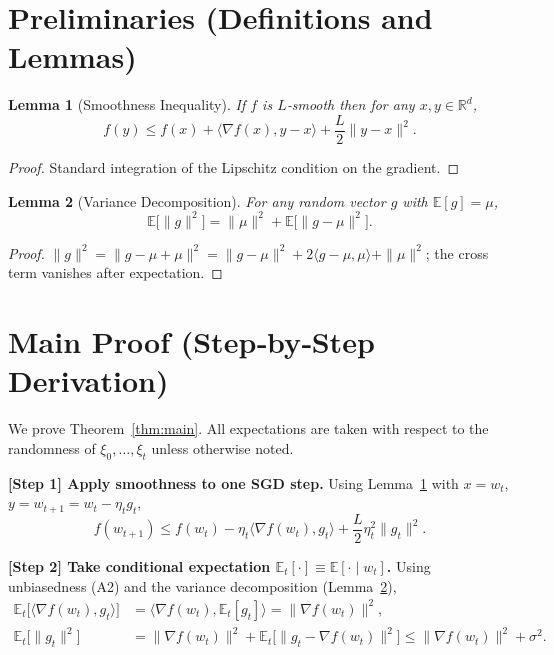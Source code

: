 \documentclass[11pt]{article}
\newtheorem{lemma}{Lemma}[section]
\begin{document}
\newpage
\section*{Preliminaries (Definitions and Lemmas)}
\begin{lemma}[Smoothness Inequality]\label{lem:smooth}
If $f$ is $L$‑smooth then for any $x,y\in\mathbb{R}^d$,
\[
f(y)\le f(x)+\langle\nabla f(x),y-x\rangle+\frac{L}{2}\|y-x\|^2 .
\]
\end{lemma}
\begin{proof}
Standard integration of the Lipschitz condition on the gradient. \end{proof}

\begin{lemma}[Variance Decomposition]\label{lem:variance}
For any random vector $g$ with $\mathbb{E}[g]=\mu$,
\[
\mathbb{E}\big[\|g\|^2\big]=\|\mu\|^2+\mathbb{E}\big[\|g-\mu\|^2\big].
\]
\end{lemma}
\begin{proof}
$\|g\|^2=\|g-\mu+\mu\|^2=\|g-\mu\|^2+2\langle g-\mu,\mu\rangle+\|\mu\|^2$;
the cross term vanishes after expectation. \end{proof}

\section*{Main Proof (Step‑by‑Step Derivation)}
We prove Theorem~\ref{thm:main}.  All expectations are taken with respect to the randomness of $\xi_0,\dots,\xi_{t}$ unless otherwise noted.

\medskip
\noindent\textbf{[Step 1] Apply smoothness to one SGD step.}  
Using Lemma~\ref{lem:smooth} with $x=w_t$, $y=w_{t+1}=w_t-\eta_t g_t$,
\[
f(w_{t+1})\le f(w_t)-\eta_t\langle\nabla f(w_t),g_t\rangle
+\frac{L}{2}\eta_t^2\|g_t\|^2 .
\tag{1}
\]

\noindent\textbf{[Step 2] Take conditional expectation $\mathbb{E}_t[\cdot]\equiv\mathbb{E}[\cdot\mid w_t]$.}  
Using unbiasedness (A2) and the variance decomposition (Lemma~\ref{lem:variance}),
\[
\begin{aligned}
\mathbb{E}_t\!\big[\langle\nabla f(w_t),g_t\rangle\big]
&= \big\langle\nabla f(w_t),\mathbb{E}_t[g_t]\big\rangle
   =\|\nabla f(w_t)\|^2 ,\\[4pt]
\mathbb{E}_t\!\big[\|g_t\|^2\big]
&= \|\nabla f(w_t)\|^2+\mathbb{E}_t\!\big[\|g_t-\nabla f(w_t)\|^2\big]
 \le \|\nabla f(w_t)\|^2+\sigma^2 .
\end{aligned}
\tag{2}
\]
\end{document}
